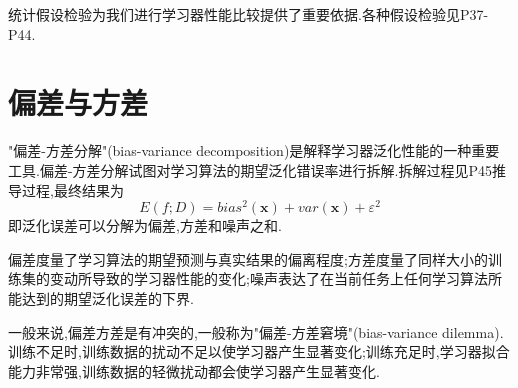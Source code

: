 统计假设检验为我们进行学习器性能比较提供了重要依据.各种假设检验见P37-P44.

\section{偏差与方差}

"偏差-方差分解"(bias-variance decomposition)是解释学习器泛化性能的一种重要工具.偏差-方差分解试图对学习算法的期望泛化错误率进行拆解.拆解过程见P45推导过程,最终结果为
\begin{equation}
E(f;D)=bias^2(\mathbf x)+var(\mathbf x)+\varepsilon^2
\end{equation}
即泛化误差可以分解为偏差,方差和噪声之和.

偏差度量了学习算法的期望预测与真实结果的偏离程度;方差度量了同样大小的训练集的变动所导致的学习器性能的变化;噪声表达了在当前任务上任何学习算法所能达到的期望泛化误差的下界.

一般来说,偏差方差是有冲突的,一般称为"偏差-方差窘境"(bias-variance dilemma).训练不足时,训练数据的扰动不足以使学习器产生显著变化;训练充足时,学习器拟合能力非常强,训练数据的轻微扰动都会使学习器产生显著变化.